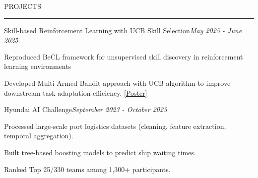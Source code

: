 \documentclass{resume} %
\renewenvironment{rSection}[2][]{
\vspace{-0.5 em} %
\sectionskip
\noindent\textcolor{RoyalPurple}{\MakeUppercase{#2}}\hfill{\footnotesize #1}\par
\sectionlineskip
\hrule
\begin{list}{}{
\setlength{\leftmargin}{1.5em}
}
\item[]
}{
\end{list}
}
\begin{document}
\newpage
\begin{rSection}{Projects}



\begin{rSubsection}{Skill-based Reinforcement Learning with UCB Skill Selection}{\em May 2025 - June 2025}{}{}
\vspace{-0.3 em}
\item Reproduced BeCL framework for unsupervised skill discovery in reinforcement learning environments 
\item Developed Multi-Armed Bandit approach with UCB algorithm to improve downstream task adaptation efficiency. \href{https://drive.google.com/file/d/1ftnfeFjGkvR5KkunbfXWZwIEhw3YWPVk/view?usp=sharing}{[Poster]}
\end{rSubsection}


\vspace{-0.75 em}
\begin{rSubsection}{Hyundai AI Challenge}{\em September 2023 - October 2023}{}{}
\vspace{-0.3 em}
\item Processed large-scale port logistics datasets (cleaning, feature extraction, temporal aggregation).
\item Built tree-based boosting models to predict ship waiting times.
\item Ranked Top 25/330 teams among 1,300+ participants.

\end{rSubsection}

\end{rSection}
\end{document}
